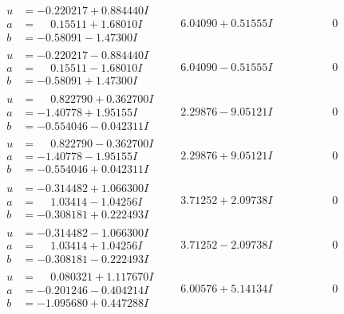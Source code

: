 \documentclass[1p]{elsarticle_modified}
\theoremstyle{definition}
\begin{document}
$$\begin{array}{c|c|c}
\begin{aligned}
u &= -0.220217 + 0.884440 I \\
a &= \phantom{-}0.15511 + 1.68010 I \\
b &= -0.58091 - 1.47300 I\end{aligned}
 & \phantom{-}6.04090 + 0.51555 I & \phantom{-0.000000 } 0 \\ \hline\begin{aligned}
u &= -0.220217 - 0.884440 I \\
a &= \phantom{-}0.15511 - 1.68010 I \\
b &= -0.58091 + 1.47300 I\end{aligned}
 & \phantom{-}6.04090 - 0.51555 I & \phantom{-0.000000 } 0 \\ \hline\begin{aligned}
u &= \phantom{-}0.822790 + 0.362700 I \\
a &= -1.40778 + 1.95155 I \\
b &= -0.554046 - 0.042311 I\end{aligned}
 & \phantom{-}2.29876 - 9.05121 I & \phantom{-0.000000 } 0 \\ \hline\begin{aligned}
u &= \phantom{-}0.822790 - 0.362700 I \\
a &= -1.40778 - 1.95155 I \\
b &= -0.554046 + 0.042311 I\end{aligned}
 & \phantom{-}2.29876 + 9.05121 I & \phantom{-0.000000 } 0 \\ \hline\begin{aligned}
u &= -0.314482 + 1.066300 I \\
a &= \phantom{-}1.03414 - 1.04256 I \\
b &= -0.308181 + 0.222493 I\end{aligned}
 & \phantom{-}3.71252 + 2.09738 I & \phantom{-0.000000 } 0 \\ \hline\begin{aligned}
u &= -0.314482 - 1.066300 I \\
a &= \phantom{-}1.03414 + 1.04256 I \\
b &= -0.308181 - 0.222493 I\end{aligned}
 & \phantom{-}3.71252 - 2.09738 I & \phantom{-0.000000 } 0 \\ \hline\begin{aligned}
u &= \phantom{-}0.080321 + 1.117670 I \\
a &= -0.201246 - 0.404214 I \\
b &= -1.095680 + 0.447288 I\end{aligned}
 & \phantom{-}6.00576 + 5.14134 I & \phantom{-0.000000 } 0 \\ \hline\begin{aligned}

\end{aligned}
\end{array}$$
\end{document}
